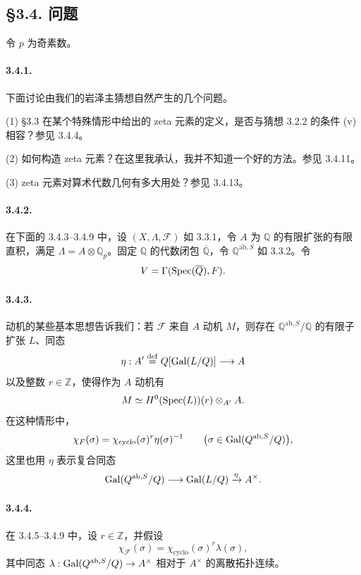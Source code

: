 \subsection*{§3.4. 问题}
令 $p$ 为奇素数。

\paragraph{3.4.1.} 下面讨论由我们的岩泽主猜想自然产生的几个问题。

(1) §3.3 在某个特殊情形中给出的 zeta 元素的定义，是否与猜想 3.2.2 的条件 (v) 相容？参见 3.4.4。

(2) 如何构造 zeta 元素？在这里我承认，我并不知道一个好的方法。参见 3.4.11。

(3) zeta 元素对算术代数几何有多大用处？参见 3.4.13。

\paragraph{3.4.2.} 在下面的 3.4.3--3.4.9 中，设 $(X,\Lambda,\mathcal F)$ 如 3.3.1，令 $A$ 为 $\mathbb Q$ 的有限扩张的有限直积，满足 $\Lambda=A\otimes\mathbb Q_p$。固定 $\mathbb Q$ 的代数闭包 $\overline{\mathbb Q}$，令 $\mathbb Q^{\mathrm{ab},S}$ 如 3.3.2。令
\[
 V=\Gamma(\operatorname{Spec}(\overline{Q}),F).
\]

\paragraph{3.4.3.} 动机的某些基本思想告诉我们：若 $\mathcal F$ 来自 $A$ 动机 $M$，则存在 $\mathbb Q^{\mathrm{ab},S}/\mathbb Q$ 的有限子扩张 $L$、同态
\[
 \eta:A'\overset{\mathrm{def}}=Q[\operatorname{Gal}(L/Q)]\longrightarrow A
\]
以及整数 $r\in\mathbb Z$，使得作为 $A$ 动机有
\[
 M\simeq H^0(\operatorname{Spec}(L))(r)\otimes_{A'}A.
\]
在这种情形中，
\[
 \chi_{F}(\sigma)=\chi_{\mathrm{cyclo}}(\sigma)^r\eta(\sigma)^{-1}
 \qquad\bigl(\sigma\in\operatorname{Gal}(Q^{\mathrm{ab},S}/Q)\bigr),
\]
这里也用 $\eta$ 表示复合同态
\[
 \operatorname{Gal}(Q^{\mathrm{ab},S}/Q)\longrightarrow\operatorname{Gal}(L/Q)
 \xrightarrow{\eta}A^\times.
\]

\paragraph{3.4.4.} 在 3.4.5--3.4.9 中，设 $r\in\mathbb Z$，并假设
\[
 \chi_{\mathcal F}(\sigma)=\chi_{\mathrm{cyclo}}(\sigma)^r\lambda(\sigma),
\]
其中同态 $\lambda:\operatorname{Gal}(Q^{\mathrm{ab},S}/Q)\to A^\times$ 相对于 $A^\times$ 的离散拓扑连续。

